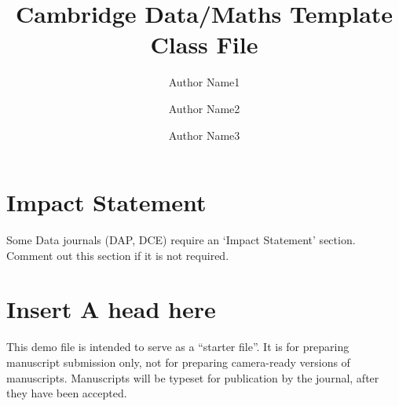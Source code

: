 \documentclass[journal=gmj]{CUP-JNL-DTM}%
\theoremstyle{definition}
\numberwithin{equation}{section}
\begin{document}
\begin{Frontmatter}

\title[Article Title]{Cambridge Data/Maths Template Class File}

\author[1,2]{Author Name1}
\author[2]{Author Name2}
\author[2]{Author Name3}


\address[1]{, ,  }

\address[2]{, , . }






\end{Frontmatter}

\section*{Impact Statement}
Some Data journals (DAP, DCE) require an `Impact Statement' section. Comment out this section if it is not required.

\localtableofcontents

\section{Insert A head here}
This demo file is intended to serve as a ``starter file''. It is for preparing manuscript submission only, not for preparing camera-ready versions of manuscripts. Manuscripts will be typeset for publication by the journal, after they have been accepted.
\end{document}
